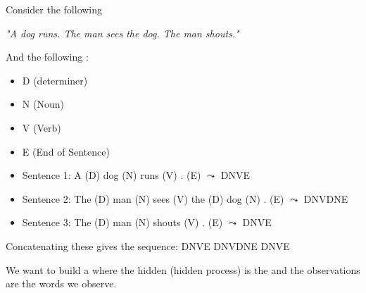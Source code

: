 
\noindent{}

Consider the following 
\begin{center}
    \textit{"A dog runs. The man sees the dog. The man shouts."}
\end{center}

And the following : 
\begin{itemize}
    \item D (determiner)
    \item N (Noun)
    \item V (Verb)
    \item E (End of Sentence)
\end{itemize}


\begin{itemize}
    \item Sentence 1: A (D) dog (N) runs (V) . (E) $\leadsto$ DNVE
    \item Sentence 2: The (D) man (N) sees (V) the (D) dog (N) . (E) $\leadsto$ DNVDNE
    \item Sentence 3: The (D) man (N) shouts (V) . (E) $\leadsto$ DNVE
\end{itemize}

Concatenating these gives the sequence: DNVE DNVDNE DNVE


We want to build a  where the hidden  (hidden process) is the  and the observations are the words we observe.

